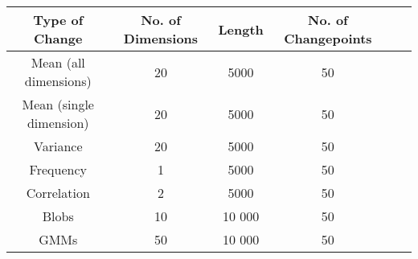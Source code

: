 \begin{center}
\begin{tabular}{SSSSSS} \toprule
    {Type of Change} & {No. of Dimensions} & {Length} & {No. of Changepoints}  \\ \midrule
    {Mean (all dimensions)}  & 20 & 5000 & 50  \\
    {Mean (single dimension)}  & 20 & 5000 & 50  \\
    {Variance}  & 20 & 5000 & 50  \\
    {Frequency}  & 1 & 5000  & 50  \\
    {Correlation} & 2 & 5000  & 50  \\
    {Blobs}  & 10 & 10 000  & 50  \\
    {GMMs}  & 50 & 10 000  & 50  \\ \bottomrule
\end{tabular}
\end{center}



